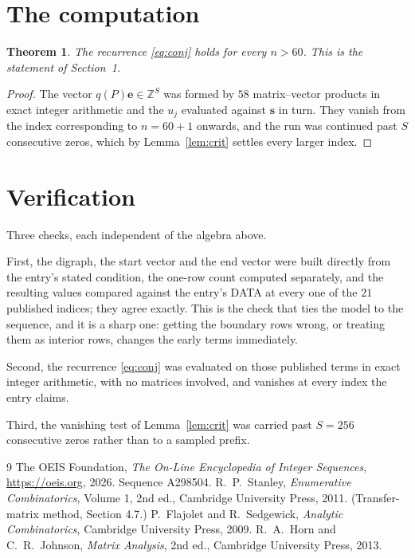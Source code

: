 \documentclass[11pt,a4paper]{article}
\theoremstyle{plain}
\newtheorem{theorem}{Theorem}
\theoremstyle{definition}
\begin{document}
\section{The computation}

\begin{theorem}
The recurrence \eqref{eq:conj} holds for every $n>60$. This is the statement of
Section~1.
\end{theorem}

\begin{proof}
The vector $q(P)\mathbf{e}\in\mathbb{Z}^{S}$ was formed by $58$ matrix--vector
products in exact integer arithmetic and the $u_j$ evaluated against $\mathbf{s}$ in turn.
They vanish from the index corresponding to $n=60+1$ onwards, and the run was continued
past $S$ consecutive zeros, which by Lemma~\ref{lem:crit} settles every larger index.
\end{proof}

\section{Verification}

Three checks, each independent of the algebra above.

First, the digraph, the start vector and the end vector were built directly from the
entry's stated condition, the one-row count computed separately, and the resulting values
compared against the entry's DATA at every one of the $21$ published indices; they
agree exactly. This is the check that ties the model to the sequence, and it is a sharp one:
getting the boundary rows wrong, or treating them as interior rows, changes the early terms
immediately.

Second, the recurrence \eqref{eq:conj} was evaluated on those published terms in exact
integer arithmetic, with no matrices involved, and vanishes at every index the entry claims.

Third, the vanishing test of Lemma~\ref{lem:crit} was carried past $S=256$ consecutive
zeros rather than to a sampled prefix.

\begin{thebibliography}{9}
 The OEIS Foundation, \emph{The On-Line Encyclopedia of Integer
Sequences}, \url{https://oeis.org}, 2026. Sequence A298504.
 R.~P.~Stanley, \emph{Enumerative Combinatorics}, Volume 1, 2nd ed.,
Cambridge University Press, 2011. (Transfer-matrix method, Section 4.7.)
 P.~Flajolet and R.~Sedgewick, \emph{Analytic Combinatorics}, Cambridge
University Press, 2009.
 R.~A.~Horn and C.~R.~Johnson, \emph{Matrix Analysis}, 2nd ed., Cambridge
University Press, 2013.
\end{thebibliography}
\end{document}
